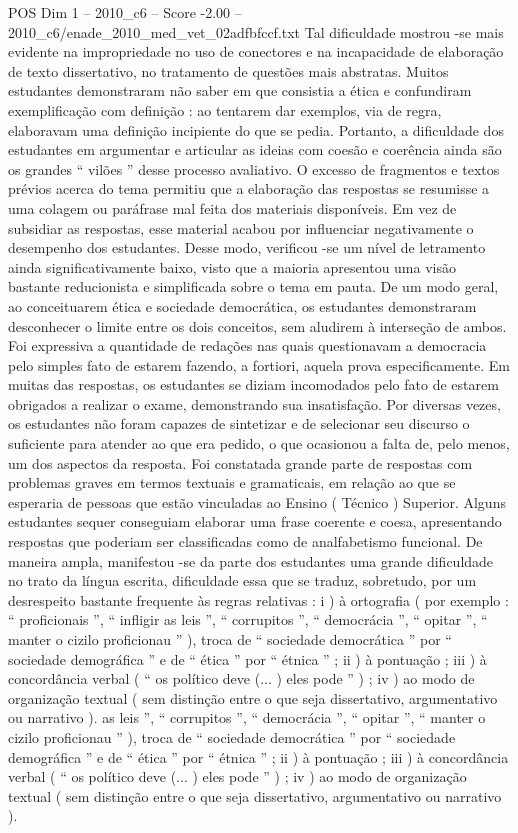 \begin{textsample}{POS Dim 1 – 2010\_c6 – Score -2.00 – 2010\_c6/enade\_2010\_med\_vet\_02adfbfccf.txt}
Tal dificuldade mostrou -se mais evidente na impropriedade no uso de conectores e na incapacidade de elaboração de texto dissertativo, no tratamento de questões mais abstratas.
Muitos estudantes demonstraram não saber em que consistia a ética e confundiram exemplificação com definição : ao tentarem dar exemplos, via de regra, elaboravam uma definição incipiente do que se pedia.
Portanto, a dificuldade dos estudantes em argumentar e articular as ideias com coesão e coerência ainda são os grandes “ vilões ” desse processo avaliativo.
O excesso de fragmentos e textos prévios acerca do tema permitiu que a elaboração das respostas se resumisse a uma colagem ou paráfrase mal feita dos materiais disponíveis.
Em vez de subsidiar as respostas, esse material acabou por influenciar negativamente o desempenho dos estudantes.
Desse modo, verificou -se um nível de letramento ainda significativamente baixo, visto que a maioria apresentou uma visão bastante reducionista e simplificada sobre o tema em pauta.
De um modo geral, ao conceituarem ética e sociedade democrática, os estudantes demonstraram desconhecer o limite entre os dois conceitos, sem aludirem à interseção de ambos.
Foi expressiva a quantidade de redações nas quais questionavam a democracia pelo simples fato de estarem fazendo, a fortiori, aquela prova especificamente.
Em muitas das respostas, os estudantes se diziam incomodados pelo fato de estarem obrigados a realizar o exame, demonstrando sua insatisfação.
Por diversas vezes, os estudantes não foram capazes de sintetizar e de selecionar seu discurso o suficiente para atender ao que era pedido, o que ocasionou a falta de, pelo menos, um dos aspectos da resposta.
Foi constatada grande parte de respostas com problemas graves em termos textuais e gramaticais, em relação ao que se esperaria de pessoas que estão vinculadas ao Ensino ( Técnico ) Superior.
Alguns estudantes sequer conseguiam elaborar uma frase coerente e coesa, apresentando respostas que poderiam ser classificadas como de analfabetismo funcional.
De maneira ampla, manifestou -se da parte dos estudantes uma grande dificuldade no trato da língua escrita, dificuldade essa que se traduz, sobretudo, por um desrespeito bastante frequente às regras relativas : i ) à ortografia ( por exemplo : “ proficionais ”, “ infligir as leis ”, “ corrupitos ”, “ democrácia ”, “ opitar ”, “ manter o cizilo proficionau ” ), troca de “ sociedade democrática ” por “ sociedade demográfica ” e de “ ética ” por “ étnica ” ; ii ) à pontuação ; iii ) à concordância verbal ( “ os político deve (... ) eles pode ” ) ; iv ) ao modo de organização textual ( sem distinção entre o que seja dissertativo, argumentativo ou narrativo ). as leis ”, “ corrupitos ”, “ democrácia ”, “ opitar ”, “ manter o cizilo proficionau ” ), troca de “ sociedade democrática ” por “ sociedade demográfica ” e de “ ética ” por “ étnica ” ; ii ) à pontuação ; iii ) à concordância verbal ( “ os político deve (... ) eles pode ” ) ; iv ) ao modo de organização textual ( sem distinção entre o que seja dissertativo, argumentativo ou narrativo ).

\end{textsample}
